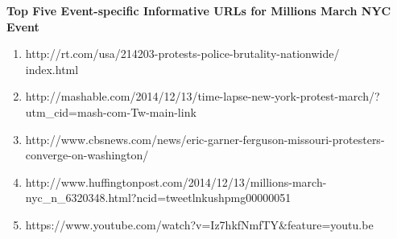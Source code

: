 \textbf{Top Five Event-specific Informative URLs for Millions March NYC Event}
\begin{enumerate}
\item http://rt.com/usa/214203-protests-police-brutality-nationwide/\\index.html
\item http://mashable.com/2014/12/13/time-lapse-new-york-protest-march/?utm\_cid=mash-com-Tw-main-link
\item http://www.cbsnews.com/news/eric-garner-ferguson-missouri-protesters-converge-on-washington/
\item http://www.huffingtonpost.com/2014/12/13/millions-march-nyc\_n\_6320348.html?ncid=tweetlnkushpmg00000051 
\item https://www.youtube.com/watch?v=Iz7hkfNmfTY\&feature=youtu.be                                                                                                                                                                                                                                                                                                                                                                                                                                                                                           
\end{enumerate}


